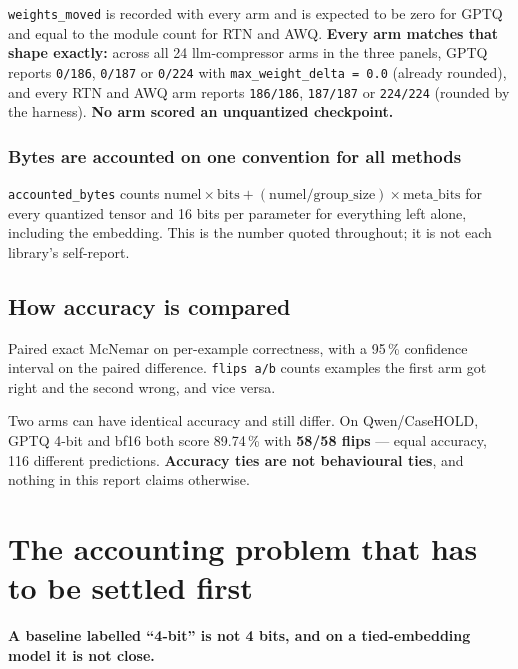 \documentclass[11pt]{article}
\newcommand{\pct}{\,\%}
\newcommand{\code}[1]{\texttt{#1}}
\newenvironment{aside}%
{\par\needspace{4\baselineskip}\vspace{0.8ex}%
\begin{lrbox}{\asidebox}\begin{minipage}{\dimexpr\textwidth-18pt\relax}\small}%
{\end{minipage}\end{lrbox}%
\noindent\setlength{\fboxsep}{9pt}\colorbox{warnbg}{\usebox{\asidebox}}%
\vspace{0.6ex}\par}
\begin{document}
\code{weights\_moved} is recorded with every arm and is expected to be zero for GPTQ and equal to
the module count for RTN and AWQ. \textbf{Every arm matches that shape exactly:} across all 24
llm-compressor arms in the three panels, GPTQ reports \code{0/186}, \code{0/187} or \code{0/224}
with \code{max\_weight\_delta = 0.0} (already rounded), and every RTN and AWQ arm reports
\code{186/186}, \code{187/187} or \code{224/224} (rounded by the harness). \textbf{No arm scored
an unquantized checkpoint.}

\subsubsection{Bytes are accounted on one convention for all methods}

\code{accounted\_bytes} counts $\mathrm{numel} \times \mathrm{bits} + (\mathrm{numel} /
\mathrm{group\_size}) \times \mathrm{meta\_bits}$ for every quantized tensor and 16 bits per
parameter for everything left alone, including the embedding. This is the number quoted
throughout; it is not each library's self-report.

\subsection{How accuracy is compared}

Paired exact McNemar on per-example correctness, with a 95\pct{} confidence interval on the
paired difference. \code{flips a/b} counts examples the first arm got right and the second
wrong, and vice versa.

\begin{aside}
Two arms can have identical accuracy and still differ. On Qwen/CaseHOLD, GPTQ 4-bit and bf16
both score 89.74\pct{} with \textbf{58/58 flips} --- equal accuracy, 116 different predictions.
\textbf{Accuracy ties are not behavioural ties}, and nothing in this report claims otherwise.
\end{aside}

\section{The accounting problem that has to be settled first}
\label{sec:accounting}

\begin{aside}
\textbf{A baseline labelled ``4-bit'' is not 4 bits, and on a tied-embedding model it is not
close.}
\end{aside}
\end{document}
